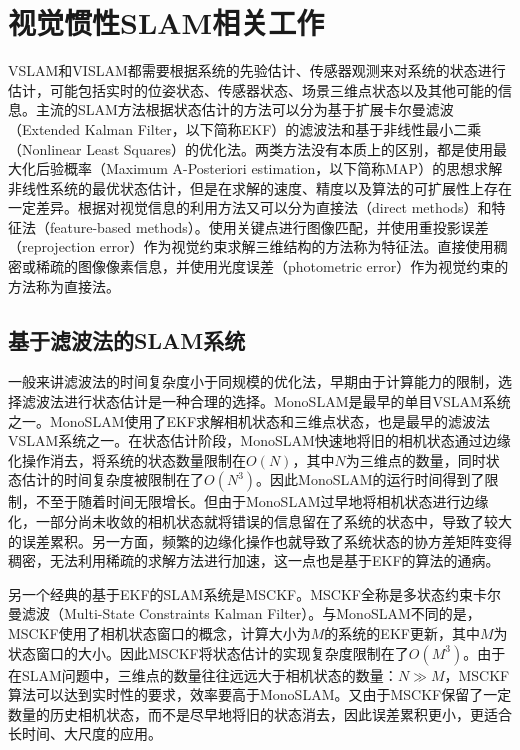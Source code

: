 \section{视觉惯性SLAM相关工作}

VSLAM和VISLAM都需要根据系统的先验估计、传感器观测来对系统的状态进行估计，可能包括实时的位姿状态、传感器状态、场景三维点状态以及其他可能的信息。主流的SLAM方法根据状态估计的方法可以分为基于扩展卡尔曼滤波（Extended Kalman Filter，以下简称EKF）的滤波法和基于非线性最小二乘（Nonlinear Least Squares）的优化法。两类方法没有本质上的区别，都是使用最大化后验概率（Maximum A-Posteriori estimation，以下简称MAP）的思想求解非线性系统的最优状态估计，但是在求解的速度、精度以及算法的可扩展性上存在一定差异。根据对视觉信息的利用方法又可以分为直接法（direct methods）和特征法（feature-based methods）。使用关键点进行图像匹配，并使用重投影误差（reprojection error）作为视觉约束求解三维结构的方法称为特征法。直接使用稠密或稀疏的图像像素信息，并使用光度误差（photometric error）作为视觉约束的方法称为直接法。

\subsection{基于滤波法的SLAM系统}

一般来讲滤波法的时间复杂度小于同规模的优化法，早期由于计算能力的限制，选择滤波法进行状态估计是一种合理的选择。MonoSLAM\citep{davison2007monoslam}是最早的单目VSLAM系统之一。MonoSLAM使用了EKF求解相机状态和三维点状态，也是最早的滤波法VSLAM系统之一。在状态估计阶段，MonoSLAM快速地将旧的相机状态通过边缘化操作消去，将系统的状态数量限制在$O(N)$，其中$N$为三维点的数量，同时状态估计的时间复杂度被限制在了$O(N^3)$。因此MonoSLAM的运行时间得到了限制，不至于随着时间无限增长。但由于MonoSLAM过早地将相机状态进行边缘化，一部分尚未收敛的相机状态就将错误的信息留在了系统的状态中，导致了较大的误差累积。另一方面，频繁的边缘化操作也就导致了系统状态的协方差矩阵变得稠密，无法利用稀疏的求解方法进行加速，这一点也是基于EKF的算法的通病。

另一个经典的基于EKF的SLAM系统是MSCKF\citep{mourikis2007multi}。MSCKF全称是多状态约束卡尔曼滤波（Multi-State Constraints Kalman Filter）。与MonoSLAM不同的是，MSCKF使用了相机状态窗口的概念，计算大小为$M$的系统的EKF更新，其中$M$为状态窗口的大小。因此MSCKF将状态估计的实现复杂度限制在了$O(M^3)$。由于在SLAM问题中，三维点的数量往往远远大于相机状态的数量：$N \gg M$，MSCKF算法可以达到实时性的要求，效率要高于MonoSLAM。又由于MSCKF保留了一定数量的历史相机状态，而不是尽早地将旧的状态消去，因此误差累积更小，更适合长时间、大尺度的应用。

